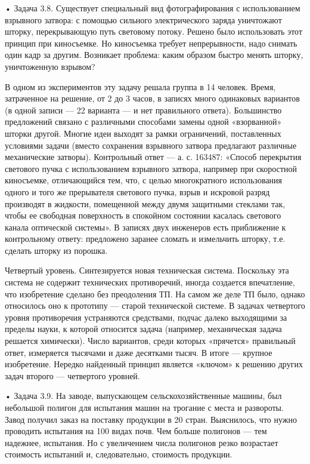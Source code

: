 •   Задача  3.8.   Существует  специальный   вид  фотографирования   с
использованием  взрывного затвора:  с помощью  сильного электрического
заряда уничтожают шторку, перекрывающую  путь световому потоку. Решено
было использовать  этот принцип при киносъемке.  Но киносъемка требует
непрерывности, надо  снимать один кадр за  другим. Возникает проблема:
каким образом быстро менять шторку, уничтоженную взрывом?

В одном из экспериментов эту задачу решала группа в 14 человек. Время,
затраченное на  решение, от 2 до  3 часов, в записях  много одинаковых
вариантов (в одной  записи — 22 варианта — и  нет правильного ответа).
Большинство предложений  связано с  различными способами  замены одной
«взорванной» шторки другой. Многие  идеи выходят за рамки ограничений,
поставленных  условиями задачи  (вместо  сохранения взрывного  затвора
предлагают различные механические затворы).  Контрольный ответ — а. с.
163487: «Способ перекрытия светового  пучка с использованием взрывного
затвора, например  при скоростной  киносъемке, отличающийся  тем, что,
с  целью  многократного использования  одного  и  того же  прерывателя
светового  пучка,  взрыв  и  искровой разряд  производят  в  жидкости,
помещенной  между двумя  защитными  стеклами так,  чтобы ее  свободная
поверхность в спокойном состоянии касалась светового канала оптической
системы».  В записях  двух инженеров  есть приближение  к контрольному
ответу: предложено  заранее сломать и измельчить  шторку, т.е. сделать
шторку из порошка.

Четвертый уровень. Синтезируется  новая техническая система. Поскольку
эта  система не  содержит технических  противоречий, иногда  создается
впечатление, что изобретение  сделано без преодоления ТП.  На самом же
деле ТП было,  однако относилось оно к прототипу  — старой технической
системе.   В  задачах   четвертого  уровня   противоречия  устраняются
средствами,  подчас  далеко выходящими  за  пределы  науки, к  которой
относится задача  (например, механическая задача  решается химически).
Число вариантов, среди которых «прячется» правильный ответ, измеряется
тысячами  и  даже десятками  тысяч.  В  итоге —  крупное  изобретение.
Нередко  найденный принцип  является «ключом»  к решению  других задач
второго — четвертого уровней.

• Задача 3.9. На  заводе, выпускающем сельскохозяйственные машины, был
небольшой полигон для испытания машин на трогание с места и развороты.
Завод получил заказ на поставку  продукции в 20 стран. Выяснилось, что
нужно проводить  испытания на 100  видах почв. Чем больше  полигонов —
тем  надежнее,  испытания.  Но  с увеличением  числа  полигонов  резко
возрастает стоимость испытаний и, следовательно, стоимость продукции.

